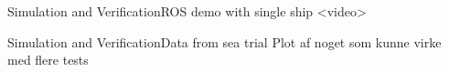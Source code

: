 \documentclass[10pt,handout]{beamer}
\begin{document}

\begin{frame}{Simulation and Verification}{ROS demo with single ship}
<video>
\end{frame}

\begin{frame}{Simulation and Verification}{Data from sea trial}
Plot af noget som kunne virke med flere tests
\end{frame}


\end{document}
